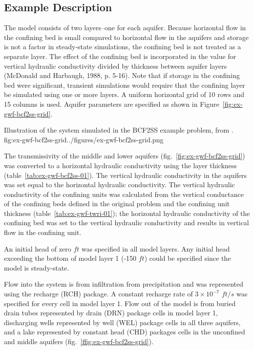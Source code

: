 \subsection{Example Description}
The model consists of two layers--one for each aquifer. Because horizontal flow in the confining bed is small compared to horizontal flow in the aquifers and storage is not a factor in steady-state simulations, the confining bed is not treated as a separate layer. The effect of the confining bed is incorporated in the value for vertical hydraulic conductivity divided by thickness between aquifer layers (McDonald and Harbaugh, 1988, p. 5-16). Note that if storage in the confining bed were significant, transient simulations would require that the confining layer be simulated using one or more layers. A uniform horizontal grid of 10 rows and 15 columns is used. Aquifer parameters are specified as shown in Figure~\ref{fig:ex-gwf-bcf2ss-grid}.

\begin{StandardFigure}{
                                     Illustration of the system simulated in the BCF2SS example problem, from \cite{mcdonaldetal1991wetdry}.
                                     }{fig:ex-gwf-bcf2ss-grid}{../figures/ex-gwf-bcf2ss-grid.png}
\end{StandardFigure}                                 




The transmissivity of the middle and lower aquifers (fig.~\ref{fig:ex-gwf-bcf2ss-grid}) was converted to a horizontal hydraulic conductivity using the layer thickness (table~\ref{tab:ex-gwf-bcf2ss-01}). The vertical hydraulic conductivity in the aquifers was set equal to the horizontal hydraulic conductivity. The vertical hydraulic conductivity of the confining units was calculated from the vertical conductance of the confining beds defined in the original problem and the confining unit thickness (table~\ref{tab:ex-gwf-twri-01}); the horizontal hydraulic conductivity of the confining bed was set to the vertical hydraulic conductivity and results in vertical flow in the confining unit.


An initial head of zero $ft$ was specified in all model layers. Any initial head exceeding the bottom of model layer 1 (-150 $ft$) could be specified since the model is steady-state.

Flow into the system is from infiltration from precipitation and was represented using the recharge (RCH) package. A constant recharge rate of $3 \times 10^{-7}$ $ft/s$ was specified for every cell in model layer 1. Flow out of the model is from buried drain tubes represented by drain (DRN) package cells in model layer 1, discharging wells represented by well (WEL) package cells in all three aquifers, and a lake represented by constant head (CHD) packages cells in the unconfined and middle aquifers (fig.~\ref{ffig:ex-gwf-bcf2ss-grid}).

